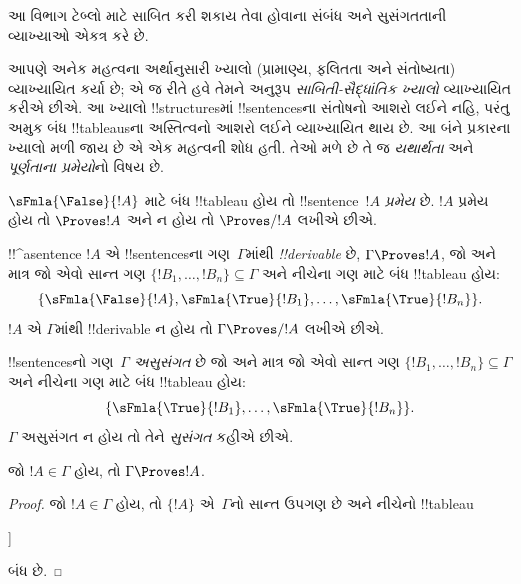 \documentclass[../../../include/open-logic-section]{subfiles}
\begin{document}
      {}
      {}


\begin{editorial}
આ વિભાગ ટેબ્લો માટે સાબિત કરી શકાય તેવા હોવાના સંબંધ અને સુસંગતતાની
વ્યાખ્યાઓ એકત્ર કરે છે.
\end{editorial}

\begin{explain}
આપણે અનેક મહત્વના અર્થાનુસારી ખ્યાલો (પ્રામાણ્ય, ફલિતતા અને સંતોષ્યતા)
વ્યાખ્યાયિત કર્યા છે; એ જ રીતે હવે તેમને અનુરૂપ \emph{સાબિતી-સૈદ્ધાંતિક
ખ્યાલો} વ્યાખ્યાયિત કરીએ છીએ. આ ખ્યાલો !!{structure}sમાં
!!{sentence}sના સંતોષનો આશરો લઈને નહિ, પરંતુ અમુક બંધ !!{tableau}sના
અસ્તિત્વનો આશરો લઈને વ્યાખ્યાયિત થાય છે. આ બંને પ્રકારના ખ્યાલો મળી જાય
છે એ એક મહત્વની શોધ હતી. તેઓ મળે છે તે જ \emph{યથાર્થતા} અને
\emph{પૂર્ણતાના પ્રમેયો}નો વિષય છે.
\end{explain}


\begin{defn}[પ્રમેયો]
$\sFmla{\False}{!A}$ માટે બંધ !!{tableau} હોય તો !!{sentence}~$!A$
\emph{પ્રમેય} છે. $!A$ પ્રમેય હોય તો $\Proves !A$ અને ન હોય તો
$\Proves/ !A$ લખીએ છીએ.
\end{defn}

\begin{defn}[!!^{derivability}]
!!^a{sentence} $!A$ એ !!{sentence}sના ગણ~$\Gamma$માંથી
\emph{!!{derivable}} છે, $\Gamma \Proves !A$, જો અને માત્ર જો એવો સાન્ત
ગણ $\{!B_1, \dots, !B_n\} \subseteq \Gamma$ અને નીચેના ગણ માટે બંધ
!!{tableau} હોય:
\[
\{
  \sFmla{\False}{!A},
  \sFmla{\True}{!B_1}, \dots,
  \sFmla{\True}{!B_n}
  \}.
\]
$!A$ એ $\Gamma$માંથી !!{derivable} ન હોય તો $\Gamma \Proves/ !A$
લખીએ છીએ.
\end{defn}

\begin{defn}[સુસંગતતા]
!!{sentence}sનો ગણ~$\Gamma$ \emph{અસુસંગત} છે જો અને માત્ર જો એવો સાન્ત
ગણ $\{!B_1, \dots, !B_n\} \subseteq \Gamma$ અને નીચેના ગણ માટે બંધ
!!{tableau} હોય:
\[
\{
  \sFmla{\True}{!B_1}, \dots,
  \sFmla{\True}{!B_n}
  \}.
\]
$\Gamma$ અસુસંગત ન હોય તો તેને \emph{સુસંગત} કહીએ છીએ.
\end{defn}

\begin{prop}[સ્વવાચકતા]
જો $!A \in \Gamma$ હોય, તો $\Gamma \Proves !A$.
\end{prop}

\begin{proof}
જો $!A \in \Gamma$ હોય, તો $\{!A\}$ એ~$\Gamma$નો સાન્ત ઉપગણ છે અને
નીચેનો !!{tableau}
\begin{oltableau}
  [\sFmla{\False}{\formula{A}}, just = \TAss
    [\sFmla{\True}{\formula{A}}, just = \TAss,close]
  ]
\end{oltableau}
બંધ છે.
\end{proof}
\end{document}
